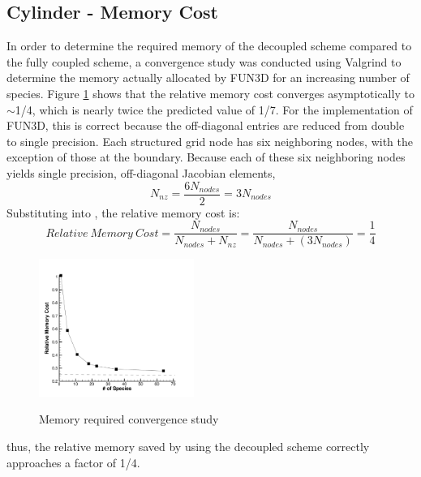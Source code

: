\subsection{Cylinder - Memory Cost}

In order to determine the required memory of the decoupled scheme compared
to the fully coupled scheme, a convergence study was conducted using
Valgrind\cite{valgrind} to determine the memory actually allocated by FUN3D for
an increasing number of species.  
Figure \ref{mem_req} shows that the relative memory cost converges asymptotically to
$\sim$1/4, which is nearly twice the predicted value of 1/7.  For the
implementation of FUN3D, this is correct because the off-diagonal entries are
reduced from double to single precision.  Each structured grid node has six
neighboring nodes, with the exception of those at the boundary.  Because each of
these six neighboring nodes yields single precision, off-diagonal Jacobian
elements, 
\begin{equation} 
  N_{nz} = \frac{6N_{nodes}}{2} = 3N_{nodes}
  \label{f3d_off_diag} 
\end{equation} 
Substituting  into , the relative memory
cost is:
\begin{equation} 
  Relative\ Memory\ Cost = 
  \frac{N_{nodes}}{N_{nodes} + N_{nz}} =
  \frac{N_{nodes}}{N_{nodes} + (3N_{nodes})}=\frac{1}{4}
\end{equation}
\begin{figure}[h] 
  \begin{center} 
    \includegraphics[width=0.45\textwidth]{figures/scitech/mem_req}
    \caption{Memory required convergence study} 
    \vspace{-2em}
    \label{mem_req}
    \end{center} 
\end{figure}
thus, the relative memory saved by using the decoupled scheme correctly
approaches a factor of 1/4.

